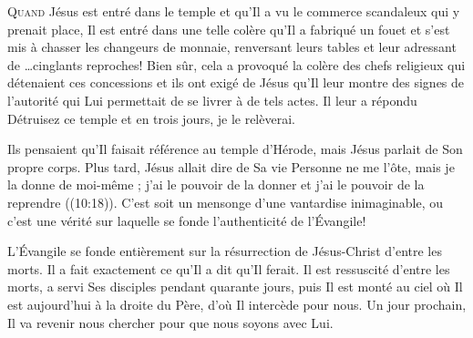 





\lettrine{Q}{uand} Jésus est entré dans le temple et qu'Il a vu le commerce
 scandaleux qui y prenait place, Il est entré dans une telle colère
 qu'Il a fabriqué un fouet et s'est mis à chasser les changeurs
 de monnaie, renversant leurs tables et leur adressant
 de \dots cinglants reproches!
 Bien sûr, cela a provoqué la colère des chefs religieux
 qui détenaient ces concessions et ils ont exigé de Jésus
 qu'Il leur montre des signes de l'autorité qui Lui permettait
 de se livrer à de tels actes.
 Il leur a répondu\frcolon{} 
 \Og Détruisez ce temple et en trois jours, je le relèverai. \Fg{}

Ils pensaient qu'Il faisait référence au temple d'Hérode,
 mais Jésus parlait de Son propre corps.
 Plus tard, Jésus allait dire de Sa vie\frcolon{} 
 \Og Personne ne me l'ôte, mais je la donne de moi-même ;
 j'ai le pouvoir de la donner et j'ai le pouvoir de la reprendre \Fg{}
 ((10:18)).
 C'est soit un mensonge d'une vantardise inimaginable,
 ou c'est une vérité sur laquelle se fonde
 l'authenticité de l'Évangile!


L'Évangile se fonde entièrement sur la résurrection
 de Jésus-Christ d'entre les morts.
 Il a fait exactement ce qu'Il a dit qu'Il ferait.
 Il est ressuscité d'entre les morts, a servi Ses disciples
 pendant quarante jours, puis Il est monté au ciel
 où Il est aujourd'hui à la droite du Père,
 d'où Il intercède pour nous.
 Un jour prochain, Il va revenir nous chercher
 pour que nous soyons avec Lui.

